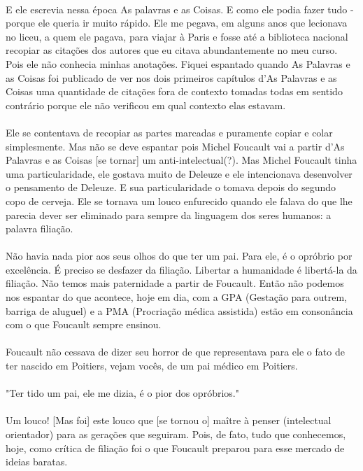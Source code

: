 \documentclass[10pt,a4paper]{book}
\begin{document}
	\\
	E ele escrevia nessa época As palavras e as Coisas. E como ele podia fazer tudo - porque ele queria ir muito rápido. Ele me pegava, em alguns anos que lecionava no liceu, a quem ele pagava, para viajar à Paris e fosse até a biblioteca nacional recopiar as citações dos autores que eu citava abundantemente no meu curso. Pois ele não conhecia minhas anotações. Fiquei espantado quando As Palavras e as Coisas foi publicado de ver nos dois primeiros capítulos d'As Palavras e as Coisas uma quantidade de citações fora de contexto tomadas todas em sentido contrário porque ele não verificou em qual contexto elas estavam.\\
	\\
	Ele se contentava de recopiar as partes marcadas e puramente copiar e colar simplesmente. Mas não se deve espantar pois Michel Foucault vai a partir d'As Palavras e as Coisas [se tornar] um anti-intelectual(?). Mas Michel Foucault tinha uma particularidade, ele gostava muito de Deleuze e ele intencionava desenvolver o pensamento de Deleuze. E sua particularidade o tomava depois do segundo copo de cerveja. Ele se tornava um louco enfurecido quando ele falava do que lhe parecia dever ser eliminado para sempre da linguagem dos seres humanos: a palavra filiação.\\
	\\
	Não havia nada pior aos seus olhos do que ter um pai. Para ele, é o opróbrio por excelência. É preciso se desfazer da filiação. Libertar a humanidade é libertá-la da filiação. Não temos mais paternidade a partir de Foucault. Então não podemos nos espantar do que acontece, hoje em dia, com a GPA (Gestação para outrem, barriga de aluguel) e a PMA (Procriação médica assistida) estão em consonância com o que Foucault sempre ensinou.\\
	\\
	Foucault não cessava de dizer seu horror de que representava para ele o fato de ter nascido em Poitiers, vejam vocês, de um pai médico em Poitiers.\\
	\\
	"Ter tido um pai, ele me dizia, é o pior dos opróbrios."\\
	\\
	Um louco! [Mas foi] este louco que [se tornou o] maître à penser (intelectual orientador) para as gerações que seguiram. Pois, de fato, tudo que conhecemos, hoje, como crítica de filiação foi o que Foucault   preparou para esse mercado de ideias baratas. \\
\end{document}
